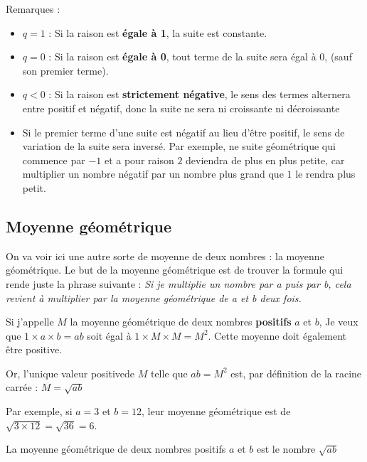 \documentclass[10pt,a4paper]{book}
\begin{document}
Remarques : \begin{itemize}
    \item $q=1$ : Si la raison est \textbf{égale à 1}, la suite est constante.
    \item $q=0$ : Si la raison est \textbf{égale à 0}, tout terme de la suite sera égal à $0$, (sauf son premier terme).
    \item $q<0$ : Si la raison est \textbf{strictement négative}, le sens des termes alternera entre positif et négatif, donc la suite ne sera ni croissante ni décroissante
    \item Si le premier terme d'une suite est négatif au lieu d'être positif, le sens de variation de la suite sera inversé. Par exemple, ne suite géométrique qui commence par $-1$ et a pour raison $2$ deviendra de plus en plus petite, car multiplier un nombre négatif par un nombre plus grand que $1$ le rendra plus petit.
\end{itemize}




\subsection{Moyenne géométrique}

On va voir ici une autre sorte de moyenne de deux nombres : la moyenne géométrique. Le but de la moyenne géométrique est de trouver la formule qui rende juste la phrase suivante :   \textit{Si je multiplie un nombre par a puis par b, cela revient à multiplier par la moyenne géométrique de a et b deux fois.}

Si j'appelle $M$ la moyenne géométrique de deux nombres \textbf{positifs} $a$ et $b$, Je veux que $1 \times a \times b= ab$ soit égal à $1 \times M \times M = M^2$. Cette moyenne doit également être positive.

Or, l'unique valeur positivede $M$ telle que $ab=M^2$ est, par définition de la racine carrée : $M = \sqrt{ab}$

Par exemple,  si $a= 3$ et $b=12$, leur moyenne géométrique est de $\sqrt{3 \times 12} = \sqrt{36} = 6$. 

\begin{de}
    La moyenne géométrique de deux nombres positifs $a$ et $b$ est le nombre $\sqrt{ab}$
\end{de}
\end{document}
